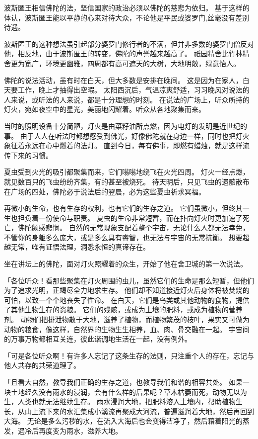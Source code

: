 \documentclass[twoside,openany]{book}
\begin{document}
波斯匿王相信佛陀的法，坚信国家的政治必须以佛陀的慈悲为依归。
基于这样的体认，波斯匿王能以平静的心来对待大众，不论他是平民或婆罗门,丝毫没有差别待遇。

波斯匿王的这种想法虽引起部分婆罗门修行者的不满，但并非多数的婆罗门僧反对他，相反地，由于波斯匿王的转变，佛陀的声誉越来越高了。
祇园精舍比竹林精舍更为宽广，环境更幽雅，四周都有高可遮天的大树，大地明敞，绿意怡人。

佛陀的说法活动，虽有时在白天，但大多数是安排在晚间。
这是因为在家人，白天要工作，晚上才抽得出空暇。
太阳西沉后，气温凉爽舒适，习习晚风对说法的人来说，或听法的人来说，都是十分理想的时刻。
在说法的广场上，听众所持的灯火，宛如夜空中的星光，美丽地闪耀着。听众从各地聚集而来。

当时的照明设备十分简陋，灯火是由菜籽油所点燃，因为电灯的发明是近世纪的事。
由于人人在听法时都想感受到佛光，好像佛陀就在身边一样，同时也把灯火象征着永远在心中燃着的法灯。
直到今日，每有佛事，即燃有蜡烛，就是这样流传下来的习惯。

夏虫受到火光的吸引都聚集而来，它们嗡嗡地绕飞在火光四周。
灯火一经点燃，就见数百只的飞虫纷纷齐集，有的甚至被烧死。
待天明后，只见飞虫的遗骸散布在广场的四处，佛陀必于说法后的翌晨，必为这些夏虫祈求冥福。

再微小的生命，也有生存的权利，也有它们的生存之道。
它们虽微小，但终其一生也担负着一份使命与职责。
夏虫的生命非常短暂，而在扑向灯火时更加速了死亡，佛陀颇感悲悯。
自然的无常现象支配着整个宇宙，无论什么人都无法幸免，不管你的身躯多么庞大，或是多么具有睿智，也无法与宇宙的无常抗衡。
想要超越无常，唯有证悟法理，洞悉永恒的真谛存在。

坐在讲坛上的佛陀，面对灯火照耀着的众生，开始了他在舍卫城的第一次说法。

「各位听众！看那些聚集在灯火周围的虫儿，虽然它们的生命是那么短暂，但他们为了追求光明，正竭尽全力地求生存。
他们却不知道接近灯火后身体将被焚烧的可怕，以致一个个地丧失了性命。
在白天，它们是鸟类或其他动物的食物，提供了其他生物生存的资粮。
它们的残骸，或成为土壤的肥料，或成为植物的营养剂。
动物们把排泄物散于大地，滋养了植物，而植物繁茂的枝叶，果实又可做为动物的粮食，像这样，自然界的生物生生相养，血、肉、骨交融在一起。
宇宙间的万事万物都相互关连，彼此谐调地生活在一起，没有例外。

「可是各位听众啊！有许多人忘记了这条生存的法则，只注重个人的存在，忘记与他人共存的共荣道理了。

「且看大自然，教导我们正确的生存之道，也教导我们和谐的相容共处。
如果一块土地经久没有雨水的浸润，会有什么样的后果呢？草木枯萎而死，动物无以为生，人类也就无法继续生存。
雨水浸润大地，把肥料溶入土壤内，帮助植物生长，从山上流下来的水汇集成小溪流再聚成大河流，普遍滋润着大地，然后再回到大海。
无论是多么污秽的水，在流入大海后也会变得洁净了，然后藉着阳光的蒸发，遇冷后再度变为雨水，滋养大地。
\end{document}
